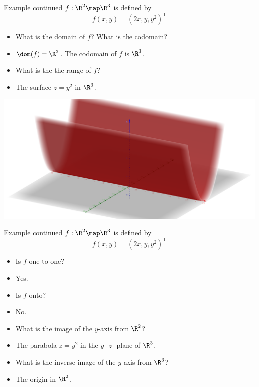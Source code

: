 \documentclass{beamer}
\begin{document}

\begin{frame}{Example continued}
$f:\R^2\map\R^3$ is defined by
$$f(x,y) = (2x, y, y^2)^{\text{T}}$$
\begin{itemize}
\item What is the domain of $f$? What is the codomain?
\item $\dom(f) =\R^2$. The codomain of $f$ is $\R^3$.
\item What is the the range of $f$?
\item The surface $z=y^2$ in $\R^3$.
\end{itemize}
\pause
\includegraphics[scale=0.1]{z-equals-y-squared}
\end{frame}


\begin{frame}{Example continued}
$f:\R^2\map\R^3$ is defined by
$$f(x,y) = (2x, y, y^2)^{\text{T}}$$
\begin{itemize}
\item Is $f$ one-to-one?
\item Yes.
\item Is $f$ onto?
\item No.
\item What is the image of the $y$-axis from $\R^2$?
\item The parabola $z=y^2$ in the $y$- $z$- plane of $\R^3$.
\item What is the inverse image of the $y$-axis from $\R^3$?
\item The origin in $\R^2$.
\end{itemize}
\end{frame}

\end{document}
